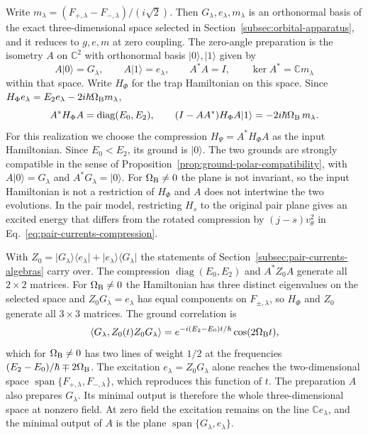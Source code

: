 \documentclass[11pt]{article}
\theoremstyle{definition}
\DeclareMathOperator{\Span}{span}
\newcommand{\C}{\mathbb C}
\newcommand{\ket}[1]{\lvert #1\rangle}
\newcommand{\bra}[1]{\langle #1\rvert}
\begin{document}
Write $m_\lambda=(F_{+,\lambda}-F_{-,\lambda})/(i\sqrt2)$. Then $G_\lambda,e_\lambda,m_\lambda$ is an orthonormal basis of the exact three-dimensional space selected in Section~\ref{subsec:orbital-apparatus}, and it reduces to $g,e,m$ at zero coupling. The zero-angle preparation is the isometry $A$ on $\C^2$ with orthonormal basis $\ket0,\ket1$ given by
\begin{equation}
 A\ket0=G_\lambda,\qquad A\ket1=e_\lambda,\qquad A^*A=I,\qquad \ker A^*=\C m_\lambda
 \label{eq:pair-currents-orbital-preparation}
\end{equation}
within that space. Write $H_\Phi$ for the trap Hamiltonian on this space. Since $H_\Phi e_\lambda=E_2e_\lambda-2i\hbar\Omega_{\rm B}m_\lambda$,
\begin{equation}
 A^*H_\Phi A=\operatorname{diag}(E_0,E_2),\qquad
 (I-AA^*)H_\Phi A\ket1=-2i\hbar\Omega_{\rm B}\,m_\lambda .
 \label{eq:pair-currents-orbital-compression}
\end{equation}
For this realization we choose the compression $H_\Psi=A^*H_\Phi A$ as the input Hamiltonian. Since $E_0<E_2$, its ground is $\ket0$. The two grounds are strongly compatible in the sense of Proposition~\ref{prop:ground-polar-compatibility}, with $A\ket0=G_\lambda$ and $A^*G_\lambda=\ket0$. For $\Omega_{\rm B}\ne0$ the plane is not invariant, so the input Hamiltonian is not a restriction of $H_\Phi$ and $A$ does not intertwine the two evolutions. In the pair model, restricting $H_s$ to the original pair plane gives an excited energy that differs from the rotated compression by $(j-s)v_\theta^2$ in Eq.~\eqref{eq:pair-currents-compression}.

With $Z_0=\ket{G_\lambda}\bra{e_\lambda}+\ket{e_\lambda}\bra{G_\lambda}$ the statements of Section~\ref{subsec:pair-currents-algebras} carry over. The compression $\operatorname{diag}(E_0,E_2)$ and $A^*Z_0A$ generate all $2\times2$ matrices. For $\Omega_{\rm B}\ne0$ the Hamiltonian has three distinct eigenvalues on the selected space and $Z_0G_\lambda=e_\lambda$ has equal components on $F_{\pm,\lambda}$, so $H_\Phi$ and $Z_0$ generate all $3\times3$ matrices. The ground correlation is
\begin{equation}
 \langle G_\lambda,Z_0(t)Z_0G_\lambda\rangle=e^{-i(E_2-E_0)t/\hbar}\cos(2\Omega_{\rm B}t),
 \label{eq:pair-currents-orbital-correlation}
\end{equation}
which for $\Omega_{\rm B}\ne0$ has two lines of weight $1/2$ at the frequencies $(E_2-E_0)/\hbar\mp2\Omega_{\rm B}$. The excitation $e_\lambda=Z_0G_\lambda$ alone reaches the two-dimensional space $\Span\{F_{+,\lambda},F_{-,\lambda}\}$, which reproduces this function of $t$. The preparation $A$ also prepares $G_\lambda$. Its minimal output is therefore the whole three-dimensional space at nonzero field. At zero field the excitation remains on the line $\C e_\lambda$, and the minimal output of $A$ is the plane $\Span\{G_\lambda,e_\lambda\}$.
\end{document}
